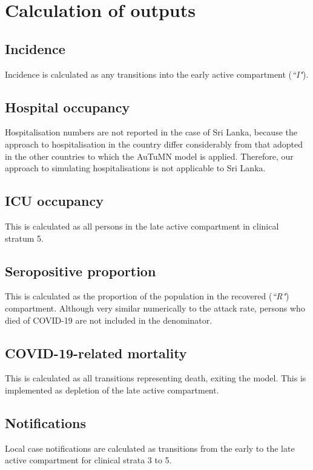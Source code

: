 \section{Calculation of outputs}

\subsection{Incidence}
Incidence is calculated as any transitions into the early active compartment (\textit{``I"}).

\subsection{Hospital occupancy}
Hospitalisation numbers are not reported in the case of Sri Lanka, because the approach to hospitalisation in the country differ considerably from that adopted in the other countries to which the AuTuMN model is applied. Therefore, our approach to simulating hospitalisations is not applicable to Sri Lanka.

\subsection{ICU occupancy}
This is calculated as all persons in the late active compartment in clinical stratum 5.

\subsection{Seropositive proportion}
This is calculated as the proportion of the population in the recovered (\textit{``R"}) compartment. Although very similar numerically to the attack rate, persons who died of COVID-19 are not included in the denominator.

\subsection{COVID-19-related mortality}
This is calculated as all transitions representing death, exiting the model. This is implemented as depletion of the late active compartment.

\subsection{Notifications}
Local case notifications are calculated as transitions from the early to the late active compartment for clinical strata 3 to 5.
